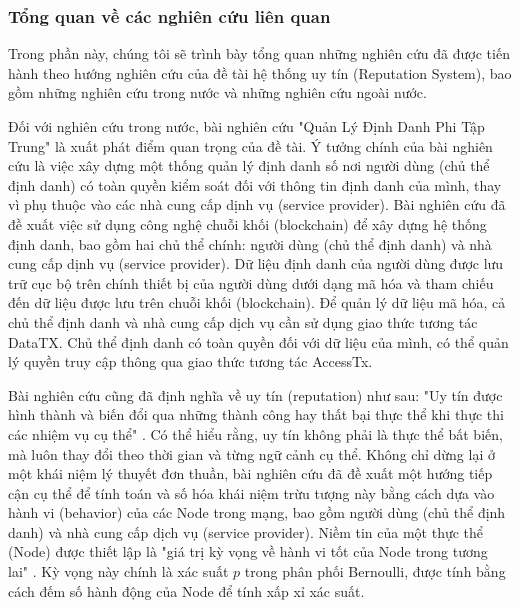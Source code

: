 \documentclass{article}[14pt]
\begin{document}
{  \subsubsection{Tổng quan về các nghiên cứu liên quan}
  Trong phần này, chúng tôi sẽ trình bày tổng quan những nghiên cứu đã được tiến hành theo hướng nghiên cứu của đề tài hệ thống uy tín (Reputation System), bao gồm những nghiên cứu trong nước và những nghiên cứu ngoài nước.
  \par
  Đối với nghiên cứu trong nước, bài nghiên cứu "Quản Lý Định Danh Phi Tập Trung" \cite{quan-ly-dinh-danh-phi-tap-trung} là xuất phát điểm quan trọng của đề tài. Ý tưởng chính của bài nghiên cứu là việc xây dựng một thống quản lý định danh số nơi người dùng (chủ thể định danh) có toàn quyền kiểm soát đối với thông tin định danh của mình, thay vì phụ thuộc vào các nhà cung cấp dịnh vụ (service provider). Bài nghiên cứu đã đề xuất việc sử dụng công nghệ chuỗi khối (blockchain) để xây dựng hệ thống định danh, bao gồm hai chủ thể chính: người dùng (chủ thể định danh) và nhà cung cấp dịnh vụ (service provider). Dữ liệu định danh của người dùng được lưu trữ cục bộ trên chính thiết bị của người dùng dưới dạng mã hóa và tham chiếu đến dữ liệu được lưu trên chuỗi khối (blockchain). Để quản lý dữ liệu mã hóa, cả chủ thể định danh và nhà cung cấp dịch vụ cần sử dụng giao thức tương tác DataTX. Chủ thể định danh có toàn quyền đối với dữ liệu của mình, có thể quản lý quyền truy cập thông qua giao thức tương tác AccessTx.
  \par
  Bài nghiên cứu cũng đã định nghĩa về uy tín (reputation) như sau: "Uy tín được hình thành và biến đổi qua những thành công hay thất bại thực thể khi thực thi các nhiệm vụ cụ thể" \cite{quan-ly-dinh-danh-phi-tap-trung,a-survey-of-trust-in-internet-applications}. Có thể hiểu rằng, uy tín không phải là thực thể bất biến, mà luôn thay đổi theo thời gian và từng ngữ cảnh cụ thể. Không chỉ dừng lại ở một khái niệm lý thuyết đơn thuần, bài nghiên cứu đã đề xuất một hướng tiếp cận cụ thể để tính toán và số hóa khái niệm trừu tượng này bằng cách dựa vào hành vi (behavior) của các Node trong mạng, bao gồm người dùng (chủ thể định danh) và nhà cung cấp dịch vụ (service provider). Niềm tin của một thực thể (Node) được thiết lập là "giá trị kỳ vọng về hành vi tốt của Node trong tương lai" \cite{quan-ly-dinh-danh-phi-tap-trung}. Kỳ vọng này chính là xác suất \(p\) trong phân phối Bernoulli, được tính bằng cách đếm số hành động của Node để tính xấp xỉ xác suất. \cite{thong-ke-may-tinh,quan-ly-dinh-danh-phi-tap-trung}
}
\end{document}
